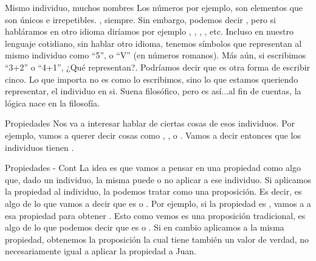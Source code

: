 
\begin{frame}{Mismo individuo, muchos nombres}
  Los números por ejemplo, son elementos que son únicos e irrepetibles. , siempre.
  \jump
  Sin embargo, podemos decir , pero si habláramos en otro
  idioma diríamos por ejemplo , ,
  , , etc.
  \jump
  Incluso en nuestro lenguaje cotidiano, sin hablar otro idioma, tenemos símbolos
  que representan al mismo individuo como ``5'', o ``V'' (en números romanos).
  \jump
  Más aún, si escribimos ``3+2'' o ``4+1'', ¿Qué representan?. Podríamos decir
  que es otra forma de escribir cinco.
  \jump
  Lo que importa no es como lo escribimos, sino lo que estamos queriendo
  representar, el individuo en si. Suena filosófico, pero es así...al fin de
  cuentas, la lógica nace en la filosofía.
\end{frame}


\begin{frame}{Propiedades}
  Nos va a interesar hablar de ciertas cosas de esos individuos. Por ejemplo,
  vamos a querer decir cosas como ,
  , o .
  \jump
  Vamos a decir entonces que los individuos tienen .
  \jump
\end{frame}


\begin{frame}{Propiedades - Cont}
  La idea es que vamos a pensar en una propiedad como algo que, dado un individuo,
  la misma puede o no aplicar a ese individuo. Si aplicamos la propiedad
  al individuo, la podemos tratar como una proposición. Es decir, es
  algo de lo que vamos a decir que es \fulltrue o \fullfalse.
  \jump
  Por ejemplo, si la propiedad es , vamos a
   a  esa propiedad para obtener
  . Esto como vemos es una proposición tradicional,
  es algo de lo que podemos decir que es \fulltrue o \fullfalse.
  \jump
  Si en cambio aplicamos a  la misma propiedad, obtenemos la
  proposición  la cual tiene también un valor de
  verdad, no necesariamente igual a aplicar la propiedad a Juan.
\end{frame}

